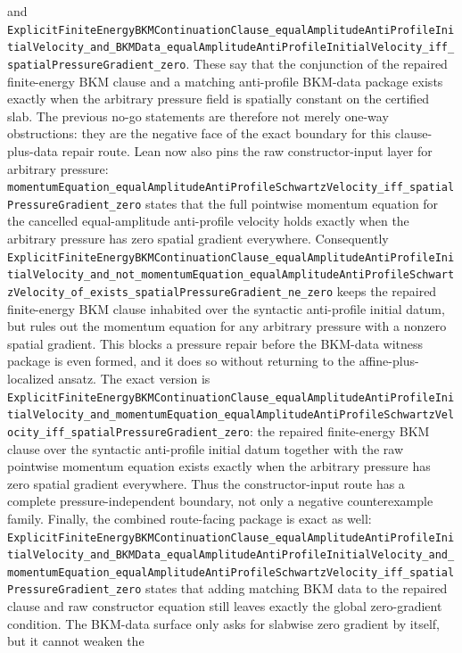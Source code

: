 \documentclass[11pt]{article}
\begin{document}
and
\texttt{ExplicitFiniteEnergyBKMContinuationClause\_equalAmplitudeAntiProfileInitialVelocity\_and\_BKMData\_equalAmplitudeAntiProfileInitialVelocity\_iff\_spatialPressureGradient\_zero}.
These say that the conjunction of the repaired finite-energy BKM clause and a
matching anti-profile BKM-data package exists exactly when the arbitrary
pressure field is spatially constant on the certified slab.  The previous
no-go statements are therefore not merely one-way obstructions: they are the
negative face of the exact boundary for this clause-plus-data repair route.
Lean now also pins the raw constructor-input layer for arbitrary pressure:
\texttt{momentumEquation\_equalAmplitudeAntiProfileSchwartzVelocity\_iff\_spatialPressureGradient\_zero}
states that the full pointwise momentum equation for the cancelled
equal-amplitude anti-profile velocity holds exactly when the arbitrary pressure
has zero spatial gradient everywhere.  Consequently
\texttt{ExplicitFiniteEnergyBKMContinuationClause\_equalAmplitudeAntiProfileInitialVelocity\_and\_not\_momentumEquation\_equalAmplitudeAntiProfileSchwartzVelocity\_of\_exists\_spatialPressureGradient\_ne\_zero}
keeps the repaired finite-energy BKM clause inhabited over the syntactic
anti-profile initial datum, but rules out the momentum equation for any
arbitrary pressure with a nonzero spatial gradient.  This blocks a pressure
repair before the BKM-data witness package is even formed, and it does so
without returning to the affine-plus-localized ansatz.
The exact version is
\texttt{ExplicitFiniteEnergyBKMContinuationClause\_equalAmplitudeAntiProfileInitialVelocity\_and\_momentumEquation\_equalAmplitudeAntiProfileSchwartzVelocity\_iff\_spatialPressureGradient\_zero}:
the repaired finite-energy BKM clause over the syntactic anti-profile initial
datum together with the raw pointwise momentum equation exists exactly when the
arbitrary pressure has zero spatial gradient everywhere.  Thus the
constructor-input route has a complete pressure-independent boundary, not only a
negative counterexample family.
Finally, the combined route-facing package is exact as well:
\texttt{ExplicitFiniteEnergyBKMContinuationClause\_equalAmplitudeAntiProfileInitialVelocity\_and\_BKMData\_equalAmplitudeAntiProfileInitialVelocity\_and\_momentumEquation\_equalAmplitudeAntiProfileSchwartzVelocity\_iff\_spatialPressureGradient\_zero}
states that adding matching BKM data to the repaired clause and raw constructor
equation still leaves exactly the global zero-gradient condition.  The BKM-data
surface only asks for slabwise zero gradient by itself, but it cannot weaken the
\end{document}
